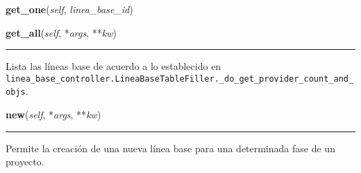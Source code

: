     \vspace{0.5ex}

\hspace{.8\funcindent}\begin{boxedminipage}{\funcwidth}

    \raggedright \textbf{get\_one}(\textit{self}, \textit{linea\_base\_id})

\setlength{\parskip}{2ex}
\setlength{\parskip}{1ex}
    \end{boxedminipage}

    \label{saip:controllers:linea_base_controller:LineaBaseController:get_all}

    \vspace{0.5ex}

\hspace{.8\funcindent}\begin{boxedminipage}{\funcwidth}

    \raggedright \textbf{get\_all}(\textit{self}, *\textit{args}, **\textit{kw})

    \vspace{-1.5ex}

    \rule{\textwidth}{0.5\fboxrule}
\setlength{\parskip}{2ex}
    Lista las líneas base de acuerdo a lo establecido en 
    \texttt{linea\_base\_controller.LineaBaseTableFiller.\_do\_get\_provider\_count\_and\_objs}.

\setlength{\parskip}{1ex}
    \end{boxedminipage}

    \label{saip:controllers:linea_base_controller:LineaBaseController:new}

    \vspace{0.5ex}

\hspace{.8\funcindent}\begin{boxedminipage}{\funcwidth}

    \raggedright \textbf{new}(\textit{self}, *\textit{args}, **\textit{kw})

    \vspace{-1.5ex}

    \rule{\textwidth}{0.5\fboxrule}
\setlength{\parskip}{2ex}
    Permite la creación de una nueva línea base para una determinada fase 
    de un proyecto.

\setlength{\parskip}{1ex}
    \end{boxedminipage}

